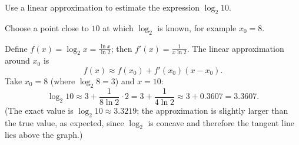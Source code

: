 
\begin{question}
Use a linear approximation to estimate the expression $\log_2 10$.
\end{question}

\begin{hint}
Choose a point close to $10$ at which $\log_2$ is known, for example $x_0=8$.
\end{hint}

\begin{solution}
Define $f(x)=\log_2 x=\frac{\ln x}{\ln 2}$; then $f'(x)=\frac{1}{x\ln 2}$. The linear approximation around $x_0$ is
\[ f(x)\approx f(x_0)+f'(x_0)(x-x_0). \]
Take $x_0=8$ (where $\log_2 8=3$) and $x=10$:
\[ \log_2 10\approx 3+\frac{1}{8\ln 2}\cdot 2=3+\frac{1}{4\ln 2}\approx 3+0.3607=\boxed{3.3607}. \]
(The exact value is $\log_2 10\approx 3.3219$; the approximation is slightly larger than the true value, as expected, since $\log_2$ is concave and therefore the tangent line lies above the graph.)
\end{solution}
